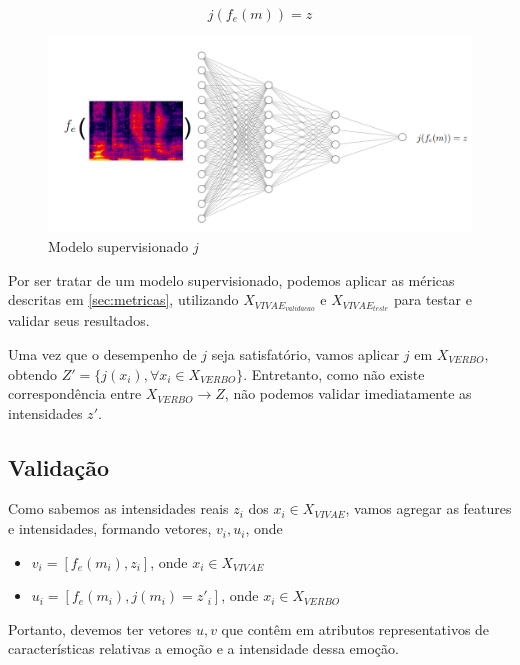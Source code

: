 \begin{equation}
    j(f_e(m)) = z
\end{equation}

\begin{figure}[!h]
\centering
\includegraphics[width=1.0\textwidth]{imagens/p-supervisionado.png}
\caption{\label{fig:jsupervisionado}Modelo supervisionado $j$}
\end{figure}

Por ser tratar de um modelo supervisionado, podemos aplicar as méricas descritas em \ref{sec:metricas}, utilizando $X_{VIVAE_{validacao}}$ e $X_{VIVAE_{teste}}$ para testar e validar seus resultados.

Uma vez que o desempenho de $j$ seja satisfatório, vamos aplicar $j$ em $X_{VERBO}$, obtendo $Z' = \{j(x_i), \forall x_i \in X_{VERBO}\}$. Entretanto, como não existe correspondência entre $X_{VERBO} \rightarrow Z$, não podemos validar imediatamente as intensidades $z'$.

\subsection{Validação}

Como sabemos as intensidades reais $z_i$ dos $x_i \in X_{VIVAE}$, vamos agregar as features e intensidades, formando vetores, $v_i, u_i$, onde

\begin{itemize}
    \item $v_i = [f_e(m_i), z_i]$, onde $x_i \in X_{VIVAE}$
    \item $u_i = [f_e(m_i), j(m_i) = z'_i]$, onde $x_i \in X_{VERBO}$
\end{itemize}

Portanto, devemos ter vetores $u,v$ que contêm em atributos representativos de características relativas a emoção e a intensidade dessa emoção.

